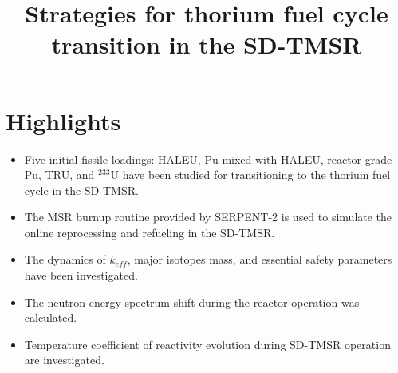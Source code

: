 \documentclass[review]{elsarticle}
\begin{document}
\begin{frontmatter}
\title{Strategies for thorium fuel cycle transition in the SD-TMSR}
\end{frontmatter}
\section*{Highlights}
\begin{itemize}
	\item Five initial fissile loadings: HALEU, Pu mixed with HALEU, reactor-grade Pu, TRU, and $^{233}$U have been studied for transitioning to the thorium fuel cycle in the SD-TMSR.
	\item The MSR burnup routine provided by SERPENT-2 is used to simulate the online reprocessing and refueling in the SD-TMSR.
	\item The dynamics of $k_{eff}$, major isotopes mass, and essential safety parameters have been investigated.
	\item The neutron energy spectrum shift during the reactor operation was calculated.
	\item Temperature coefficient of reactivity evolution during SD-TMSR operation are investigated.
\end{itemize}
\end{document}
